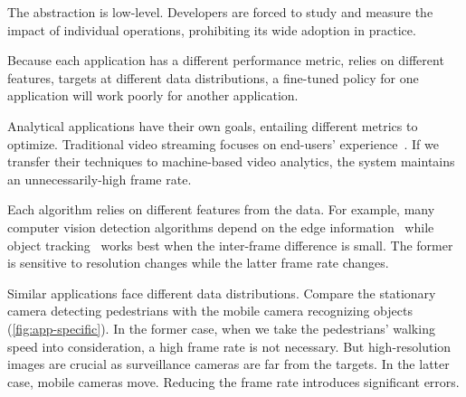 The abstraction is low-level. Developers are forced to study and measure the
impact of individual operations, prohibiting its wide adoption in practice.

 Because each application
has a different performance metric, relies on different features, targets at
different data distributions, a fine-tuned policy for one application will work
poorly for another application.

Analytical applications have their own goals, entailing different metrics to
optimize. Traditional video streaming focuses on end-users'
experience~\cite{yin2015control, michalos2012dynamic, pantos2016http}. If we
transfer their techniques to machine-based video analytics, the system maintains
an unnecessarily-high frame rate.

Each algorithm relies on different features from the data. For example, many
computer vision detection algorithms depend on the edge
information~\cite{canny1986computational, lowe2004distinctive, viola2001rapid}
while object tracking~\cite{allen2004object} works best when the inter-frame
difference is small. The former is sensitive to resolution changes while the
latter frame rate changes.

Similar applications face different data distributions. Compare the stationary
camera detecting pedestrians with the mobile camera recognizing objects
(\autoref{fig:app-specific}). In the former case, when we take the pedestrians'
walking speed into consideration, a high frame rate is not necessary. But
high-resolution images are crucial as surveillance cameras are far from the
targets. In the latter case, mobile cameras move. Reducing the frame rate
introduces significant errors.

